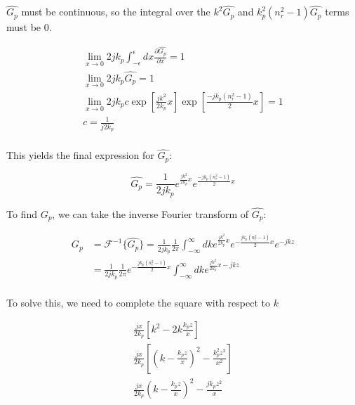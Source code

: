 \noindent $\hat{G_p}$ must be continuous, so the integral over the $k^2\hat{G_p}$ and $k_p^2(n_r^2-1)\hat{G_p}$ terms must be 0.

\begin{equation}
\begin{gathered}
\lim_{x\rightarrow 0}2jk_p\int_{-\epsilon}^{\epsilon}dx\frac{\partial\hat{G_p}}{\partial x}= 1\\
\lim_{x\rightarrow 0}2jk_p\hat{G_p} = 1 \\
\lim_{x\rightarrow 0}2jk_pc\exp\left[\frac{jk^2}{2k_p}x\right]\exp\left[\frac{-jk_p(n_r^2-1)}{2}x\right] = 1\\
c = \frac{1}{j2k_p}\\
\end{gathered}
\label{gf_eq:11cb}
\end{equation}
 \renewcommand{\baselinestretch}{2} \small\normalsize
 
\noindent This yields the final expression for $\hat{G_p}$:

\begin{equation}
\hat{G_p}= \frac{1}{2jk_p}e^{\frac{jk^2}{2k_p}x}e^{\frac{-jk_p(n_r^2-1)}{2}x}
\label{gf_eq:11cc}
\end{equation}
 \renewcommand{\baselinestretch}{2} \small\normalsize
 
\noindent To find $G_p$, we can take the inverse Fourier transform of $\hat{G_p}$:

\begin{equation}
\begin{aligned}
G_p &= \mathcal{F}^{-1}\{\hat{G_p}\} = \frac{1}{2jk_p}\frac{1}{2\pi}\int_{-\infty}^{\infty}dk e^{\frac{jk^2}{2k_p}x}e^{-\frac{jk_p(n_r^2-1)}{2}x}e^{-jkz} \\
& = \frac{1}{2jk_p}\frac{1}{2\pi}e^{-\frac{jk_p(n_r^2-1)}{2}x}\int_{-\infty}^{\infty}dk e^{\frac{jk^2}{2k_p}x-jkz} \\
\end{aligned}
\label{gf_eq:11d}
\end{equation}
 \renewcommand{\baselinestretch}{2} \small\normalsize
 
\noindent To solve this, we need to complete the square with respect to $k$

\begin{equation}
\begin{gathered}
\frac{jx}{2k_p}\left[k^2  -2k\frac{k_pz}{x}\right]\\
\frac{jx}{2k_p}\left[\left(k - \frac{k_pz}{x}\right)^2 - \frac{k_p^2z^2}{x^2} \right]\\
\frac{jx}{2k_p}\left(k - \frac{k_pz}{x}\right)^2 - \frac{jk_pz^2}{x}\\
\end{gathered}
\label{gf_eq:11e}
\end{equation}
 \renewcommand{\baselinestretch}{2} \small\normalsize
 
